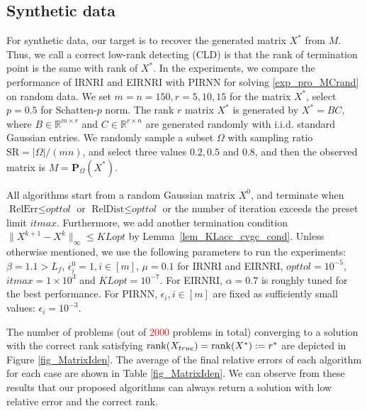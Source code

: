 \documentclass[twoside,11pt]{article}
\newcommand\red[1]{\textcolor{red}{#1}}
\numberwithin{equation}{section}
\begin{document}
\subsection{Synthetic data}

For synthetic data, our target is to recover the generated matrix $X^{*}$ from $M$. Thus, we call a correct low-rank detecting (CLD) is that the rank of termination point is the same with rank of $X^{*}$. 
In the experiments, we compare  the performance of IRNRI and EIRNRI with PIRNN \cite{opt_simu_svd_2017}  for solving \eqref{exp_pro_MCrand} on random data.
We set $m = n = 150,r=5,10,15$ for the matrix $X^{*}$, select $p=0.5$ for Schatten-$p$ norm.  
The rank $r$ matrix $X^{*}$ is generated by $X^{*} = BC$, where $B\in\mathbb{R}^{m\times r}$ and $C\in\mathbb{R}^{r\times n}$ are generated randomly with {i.i.d.} standard Gaussian entries. 
We randomly sample a subset $\Omega$ with sampling ratio $\text{SR}=|\Omega| / {(mn)}$, and select three values $0.2, 0.5$ and $0.8$, and then the observed matrix is $M = \mathbf{P}_{\Omega} (X^{*})$.






All algorithms start from a random Gaussian matrix $X^{0}$, and terminate when $\text{RelErr}\le\textit{opttol}$ or $\text{RelDist}\le\textit{opttol}$ or the number of iteration exceeds the preset limit $\textit{itmax}$. Furthermore, we add another termination condition $\|X^{k+1}-X^{k}\|_{\infty} \le \textit{KLopt}$ by Lemma~\ref{lem_KLacc_cvgc_cond}.
Unless otherwise mentioned, we use the following parameters to run the experiments: $\beta=1.1 > L_f$,  $\epsilon_{i}^{0}=1,i\in[m]$, $\mu=0.1$ for IRNRI and EIRNRI, $\textit{opttol}=10^{-5} $, $\textit{itmax}=1\times 10^{3}$ and $\textit{KLopt} = 10^{-7}$.  For EIRNRI,  $\alpha = 0.7$ is roughly tuned for the best performance. 
For PIRNN,  $\epsilon_i, i\in[m]$ are fixed as sufficiently small values: $\epsilon_i =  10^{-3}$.  


The number of problems (out of \red{2000} problems in total) converging to a solution with the correct rank satisfying ${\rm rank}(X_{true}) = {\rm rank}(X^{*}):=r^{*}$ are depicted 
 in Figure \ref{fig_MatrixIden}.  The average of the final  relative errors of each algorithm for each case 
 are shown in Table \ref{fig_MatrixIden}. 
We can observe from these results that our proposed algorithms can always return 
a solution with low relative error and the correct rank.  
\end{document}
